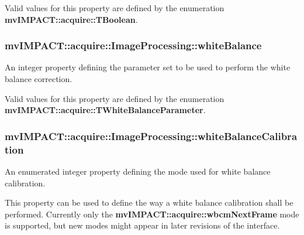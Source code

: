 Valid values for this property are defined by the enumeration {\bfseries mv\+I\+M\+P\+A\+C\+T\+::acquire\+::\+T\+Boolean}. \hypertarget{classmv_i_m_p_a_c_t_1_1acquire_1_1_image_processing_afc417e7cc989db27966d9b267d337e0f}{
\subsubsection[{white\+Balance}]{ mv\+I\+M\+P\+A\+C\+T\+::acquire\+::\+Image\+Processing\+::white\+Balance}}\label{classmv_i_m_p_a_c_t_1_1acquire_1_1_image_processing_afc417e7cc989db27966d9b267d337e0f}


An integer property defining the parameter set to be used to perform the white balance correction. 

Valid values for this property are defined by the enumeration {\bfseries mv\+I\+M\+P\+A\+C\+T\+::acquire\+::\+T\+White\+Balance\+Parameter}. \hypertarget{classmv_i_m_p_a_c_t_1_1acquire_1_1_image_processing_a6b158bb26649b95f98f9efef72eddc33}{
\subsubsection[{white\+Balance\+Calibration}]{ mv\+I\+M\+P\+A\+C\+T\+::acquire\+::\+Image\+Processing\+::white\+Balance\+Calibration}}\label{classmv_i_m_p_a_c_t_1_1acquire_1_1_image_processing_a6b158bb26649b95f98f9efef72eddc33}


An enumerated integer property defining the mode used for white balance calibration. 

This property can be used to define the way a white balance calibration shall be performed. Currently only the {\bfseries mv\+I\+M\+P\+A\+C\+T\+::acquire\+::wbcm\+Next\+Frame} mode is supported, but new modes might appear in later revisions of the interface.

